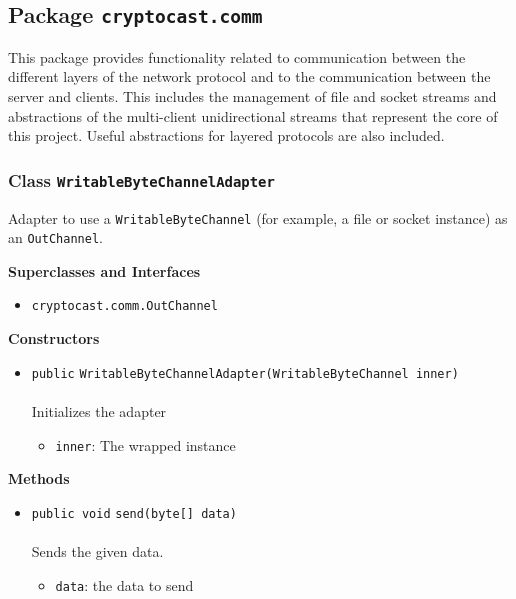 \subsection{Package \lstinline!cryptocast.comm!}
This package provides functionality related to communication between the different layers
 of the network protocol and to the communication between the server and clients. This includes
 the management of file and socket streams and abstractions of the multi-client unidirectional
 streams that represent the core of this project.
 Useful abstractions for layered protocols are also included.
\subsubsection{Class \lstinline|WritableByteChannelAdapter|}
Adapter to use a \lstinline|WritableByteChannel| (for example, a file or socket instance) as
 an \lstinline|OutChannel|. \\
\noindent\begin{minipage}[t]{5cm}
\vspace{0.3em}
\hspace*{2em}
\vspace{0.3em}
\end{minipage}



\textbf{\sffamily Superclasses and Interfaces}
\begin{itemize}
\item \lstinline|cryptocast.comm.OutChannel|
\end{itemize}


\textbf{\sffamily Constructors}
\begin{itemize}
\item \lstinline|public| \lstinline|WritableByteChannelAdapter|\lstinline|(WritableByteChannel inner)|\\ \\[-0.6em]
Initializes the adapter
\begin{itemize}
\item \lstinline|inner|: The wrapped instance
\end{itemize}



\end{itemize}


\textbf{\sffamily Methods}
\begin{itemize}
\item \lstinline|public void| \lstinline|send|\lstinline|(byte[] data)|\\ \\[-0.6em]
Sends the given data.
\begin{itemize}
\item \lstinline|data|: the data to send
\end{itemize}



\end{itemize}


